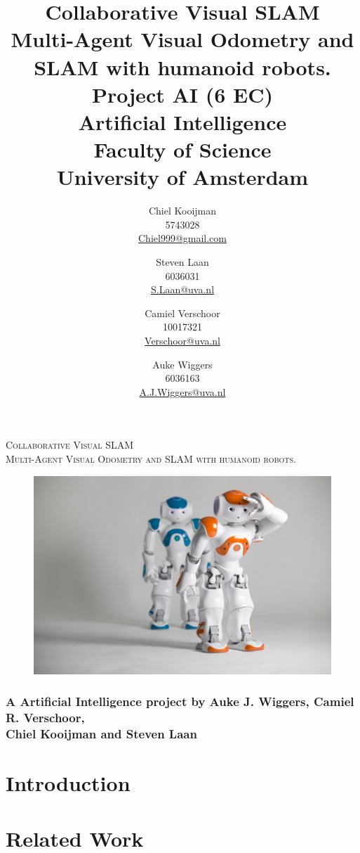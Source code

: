 \documentclass[a4paper]{article}
\author{Chiel Kooijman\\5743028\\\url{Chiel999@gmail.com} \and
Steven Laan\\6036031\\\url{S.Laan@uva.nl} \and
Camiel Verschoor\\10017321\\\url{Verschoor@uva.nl} \and
Auke Wiggers\\6036163\\\url{A.J.Wiggers@uva.nl}}
\title{Collaborative Visual SLAM\\\normalsize Multi-Agent Visual Odometry and SLAM with humanoid robots.\\Project AI (6 EC)\\Artificial Intelligence\\Faculty of Science\\University of Amsterdam}
\begin{document}
\thispagestyle{empty}
\begin{center}
\Large\textsc{Collaborative Visual SLAM}\\
\normalsize\textsc{Multi-Agent Visual Odometry and SLAM with humanoid robots.}

\vspace{2cm}

\begin{figure}[!ht]
\centering
\includegraphics[width=\textwidth]{images/front.jpg}
\end{figure}

\subsubsection*{A Artificial Intelligence project by Auke J. Wiggers, Camiel R. Verschoor,\\Chiel Kooijman and Steven Laan}
\end{center}

\newpage

\thispagestyle{empty}
\mbox{}
\newpage

\maketitle
\clearpage

\thispagestyle{empty}
\tableofcontents
\clearpage

\section{Introduction}

\section{Related Work}
\end{document}
